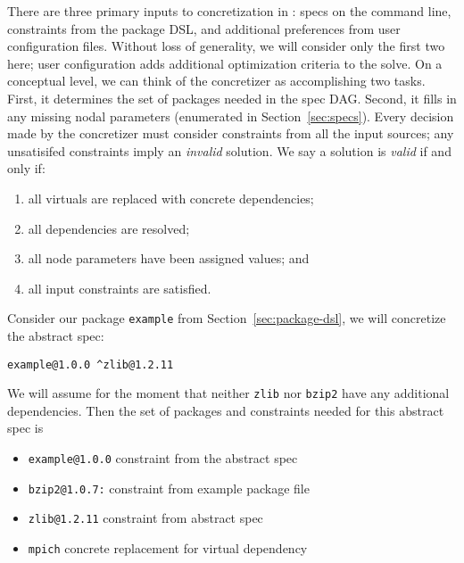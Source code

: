 There are three primary inputs to concretization in \spack: specs on the command line,
constraints from the package DSL, and additional preferences from user configuration
files. Without loss of generality, we will consider only the first two here; user
configuration adds additional optimization criteria to the solve.
%
%
%
On a conceptual level, we can think of the concretizer as accomplishing two tasks.
First, it determines the set of packages needed in the spec DAG. Second, it fills in any
missing nodal parameters (enumerated in Section~\ref{sec:specs}). Every decision made by
the concretizer must consider constraints from all the input sources; any unsatisifed
constraints imply an {\it invalid} solution. We say a solution is {\it valid} if and only if:
\begin{enumerate}
\item all virtuals are replaced with concrete dependencies;
\item all dependencies are resolved;
\item all node parameters have been assigned values; and
\item all input constraints are satisfied.
\end{enumerate}

Consider our package \texttt{example} from Section~\ref{sec:package-dsl}, we will
concretize the abstract spec:
\begin{verbatim}
example@1.0.0 ^zlib@1.2.11
\end{verbatim}
We will assume for the moment that neither \texttt{zlib} nor \texttt{bzip2} have any
additional dependencies. Then the set of packages and constraints needed for this
abstract spec is

\begin{itemize}
\item {\tt example@1.0.0} constraint from the abstract spec
\item {\tt bzip2@1.0.7:} constraint from example package file
\item {\tt zlib@1.2.11} constraint from abstract spec
\item {\tt mpich} concrete replacement for virtual dependency
\end{itemize}

